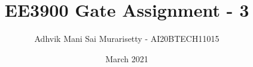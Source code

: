\documentclass[journal,12pt,twocolumn]{IEEEtran}
\date{March 2021}
\DeclareMathOperator*{\Res}{Res}
\begin{document}
\newtheorem{theorem}{Theorem}[section]
\newtheorem{problem}{Problem}
\newtheorem{proposition}{Proposition}[section]
\newtheorem{lemma}{Lemma}[section]
\newtheorem{corollary}[theorem]{Corollary}
\newtheorem{example}{Example}[section]
\newtheorem{definition}[problem]{Definition}

\newcommand{\BEQA}{\begin{eqnarray}}
\newcommand{\EEQA}{\end{eqnarray}}
\newcommand{\define}{\stackrel{\triangle}{=}}

\raggedbottom
\setlength{\parindent}{0pt}
\providecommand{\mbf}{\mathbf}
\providecommand{\pr}[1]{\ensuremath{\Pr\left(#1\right)}}
\providecommand{\qfunc}[1]{\ensuremath{Q\left(#1\right)}}
\providecommand{\fn}[1]{\ensuremath{f\left({#1}\right)}}
\providecommand{\e}[1]{\ensuremath{E\left(#1\right)}}
\providecommand{\sbrak}[1]{\ensuremath{{}\left[#1\right]}}
\providecommand{\lsbrak}[1]{\ensuremath{{}\left[#1\right.}}
\providecommand{\rsbrak}[1]{\ensuremath{{}\left.#1\right]}}
\providecommand{\brak}[1]{\ensuremath{\left(#1\right)}}
\providecommand{\lbrak}[1]{\ensuremath{\left(#1\right.}}
\providecommand{\rbrak}[1]{\ensuremath{\left.#1\right)}}
\providecommand{\cbrak}[1]{\ensuremath{\left\{#1\right\}}}
\providecommand{\lcbrak}[1]{\ensuremath{\left\{#1\right.}}
\providecommand{\rcbrak}[1]{\ensuremath{\left.#1\right\}}}
\theoremstyle{remark}
\newtheorem{rem}{Remark}
\newcommand{\sgn}{\mathop{\mathrm{sgn}}}
\newcommand{\comb}[2]{{}^{#1}\mathrm{C}_{#2}}
\providecommand{\abs}[1]{\vert#1\vert}
\providecommand{\res}[1]{\Res\displaylimits_{#1}} 
\providecommand{\norm}[1]{\lVert#1\rVert}
\providecommand{\mtx}[1]{\mathbf{#1}}
\providecommand{\mean}[1]{E\sbrak{ #1 }}
\providecommand{\fourier}{\overset{\mathcal{F}}{ \rightleftharpoons}}
\providecommand{\system}{\overset{\mathcal{H}}{ \longleftrightarrow}}
\newcommand{\solution}{\noindent \textbf{Solution: }}
\newcommand{\cosec}{\,\text{cosec}\,}
\providecommand{\dec}[2]{\ensuremath{\overset{#1}{\underset{#2}{\gtrless}}}}
\newcommand{\myvec}[1]{\ensuremath{\begin{pmatrix}#1\end{pmatrix}}}
\newcommand{\mydet}[1]{\ensuremath{\begin{vmatrix}#1\end{vmatrix}}}
\makeatletter
{}
\makeatother
\let\StandardTheFigure\thefigure
\let\vec\mathbf
\vspace{3cm}
\title{EE3900 Gate Assignment - 3}
\author{Adhvik Mani Sai Murarisetty - AI20BTECH11015}
\maketitle
\newpage
\bigskip
\renewcommand{\thetable}{\theenumi}
\end{document}
